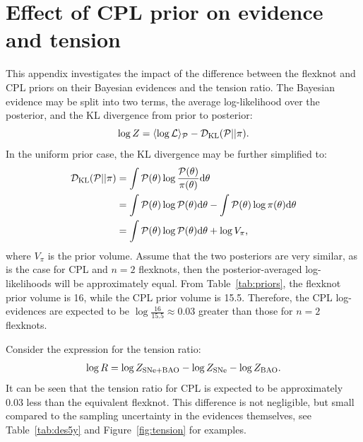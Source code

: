 \documentclass[fleqn,usenatbib]{mnras}
\begin{document}
    \section{Effect of CPL prior on evidence and tension}\label{apx:prior}

    This appendix investigates the impact of the difference between the flexknot and CPL priors on their Bayesian evidences and the tension ratio.
    The Bayesian evidence may be split into two terms, the average log-likelihood over the posterior, and the KL divergence from prior to posterior:
    \begin{equation}
        \log Z = \langle\log\mathcal L\rangle_\mathcal P - \mathcal D_\mathrm{KL}(\mathcal P||\pi)\text.
    \end{equation}
    In the uniform prior case, the KL divergence may be further simplified to:
    \begin{equation}
        \begin{aligned}
            \mathcal D_\mathrm{KL}(\mathcal P||\pi) &= \int \mathcal P(\theta)\log\frac{\mathcal P(\theta)}{\pi(\theta)}\mathrm d\theta\\
            &= \int\mathcal P(\theta)\log\mathcal P(\theta)\mathrm d\theta - \int\mathcal P(\theta)\log\pi(\theta)\mathrm d\theta\\
            &= \int\mathcal P(\theta)\log\mathcal P(\theta)\mathrm d\theta + \log V_\pi\text,
        \end{aligned}
    \end{equation}
    where $V_\pi$ is the prior volume.
    Assume that the two posteriors are very similar, as is the case for CPL and $n=2$ flexknots, then the posterior-averaged log-likelihoods will be approximately equal.
    From Table~\ref{tab:priors}, the flexknot prior volume is 16, while the CPL prior volume is 15.5.
    Therefore, the CPL log-evidences are expected to be $\log\frac{16}{15.5}\approx0.03$ greater than those for $n=2$ flexknots.

    Consider the expression for the tension ratio:
    \begin{equation}
            \log R = \log Z_\mathrm{SNe+BAO} - \log Z_\mathrm{SNe} - \log Z_\mathrm{BAO}\text.
    \end{equation}
    It can be seen that the tension ratio for CPL is expected to be approximately $0.03$ less than the equivalent flexknot.
    This difference is not negligible, but small compared to the sampling uncertainty in the evidences themselves, see Table~\ref{tab:des5y} and Figure~\ref{fig:tension} for examples.



    \bsp	%
    \label{lastpage}
\end{document}
